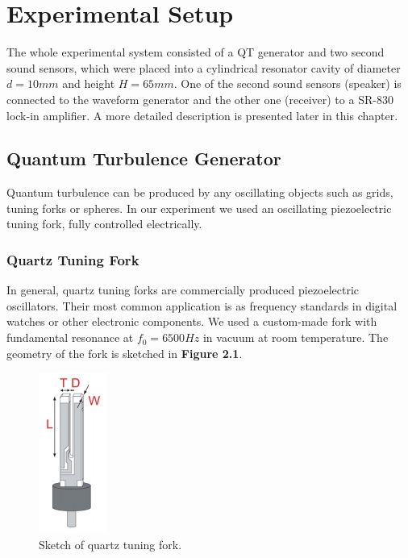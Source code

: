 \newpage

\chapter{Experimental Setup}

The whole experimental system consisted of a QT generator and two second sound sensors, which were placed into a cylindrical resonator cavity of diameter $ d=10\unit{mm}$ and height $ H=65\unit{mm} $. One of the second sound sensors (speaker) is connected to the waveform generator and the other one (receiver) to a SR-830 lock-in amplifier. A more detailed description is presented later in this chapter.


\section{Quantum Turbulence Generator}

Quantum turbulence can be produced by any oscillating objects such as grids, tuning forks or spheres. In our experiment we used an oscillating piezoelectric tuning fork, fully controlled electrically. 

\subsection*{Quartz Tuning Fork}

In general, quartz tuning forks are commercially produced piezoelectric oscillators. Their most common application is as frequency standards in digital watches or other electronic components.
We used a custom-made fork with fundamental resonance at $ f_0 = 6500\unit{Hz} $ in vacuum at room temperature. The geometry of the fork is sketched in {\sffamily\textbf{Figure 2.1}}.

\begin{figure}
	\centering
	\vspace{-0.8cm}
	\includegraphics[width=0.20\textwidth]{graphics/quartz}
	\caption{Sketch of quartz tuning fork.}
	\vspace{-1.8cm}	
\end{figure}

